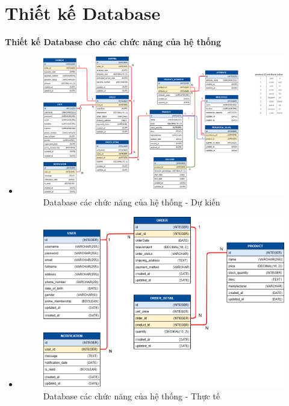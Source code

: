 \section{Thiết kế Database}
\textbf{Thiết kế Database cho các chức năng của hệ thống}
\begin{itemize}
    \item  \begin{figure}[H]
        \begin{center}
        \includegraphics[scale = 0.25]{images/phat/DB_Design-main.png}
        \vspace*{7mm}
        \caption{Database các chức năng của hệ thống - Dự kiến}
        \end{center}
        \label{}
    \end{figure}
    \item  \begin{figure}[H]
        \begin{center}
        \includegraphics[scale = 0.4]{images/phat/DB_Design-release.png}
        \vspace*{7mm}
        \caption{Database các chức năng của hệ thống - Thực tế}
        \end{center}
        \label{}
    \end{figure}
\end{itemize}
